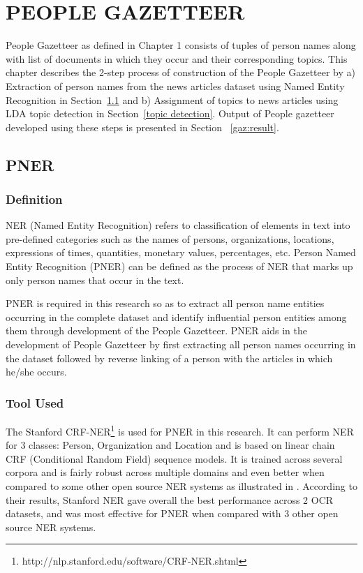 \chapter{PEOPLE GAZETTEER}
\label{chapter:people gazetteer}

People Gazetteer as defined in Chapter 1 consists of tuples of person names along with list of documents in which they occur and their corresponding topics. This chapter describes the 2-step process of construction of the People Gazetteer by
a) Extraction of person names from the news articles dataset using Named Entity Recognition in  Section~\ref{ner} and
b) Assignment of topics to news articles using LDA topic detection in  Section~\ref{topic detection}.
Output of People gazetteer developed using these steps is presented in Section ~\ref{gaz:result}.

\section{PNER}
\label{ner}


\subsection{Definition}
NER (Named Entity Recognition) refers to classification of elements in text into pre-defined categories such as the names of persons, organizations, locations, expressions of times, quantities, monetary values, percentages, etc. 
Person Named Entity Recognition (PNER) can be defined as the process of NER that marks up only person names that occur in the text.

PNER is required in this research so as to extract all person name entities occurring in the complete dataset and identify influential person entities among them through development of the People Gazetteer. 
PNER aids in the development of People Gazetteer by first extracting all person names occurring in the dataset followed by reverse linking of a person with the articles in which he/she occurs.

\subsection{Tool Used}

The Stanford CRF-NER\footnote{http://nlp.stanford.edu/software/CRF-NER.shtml} is used for PNER in this research. It can perform NER for 3 classes: Person, Organization and Location and is based on linear chain CRF (Conditional Random Field) sequence models. It is trained across several corpora and is fairly robust across multiple domains and even better when compared to some other open source NER systems as illustrated in \cite{rodriquez2012comparison}. According to their results, Stanford NER gave overall the best performance across 2 OCR datasets, and was most effective for PNER when compared with 3 other open source NER systems.


